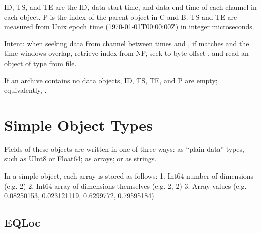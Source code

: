\documentclass[letterpaper,11pt,english]{sphinxmanual}
\begin{document}
ID, TS, and TE are the ID, data start time, and data end time of each channel
in each object. P is the index of the parent object in C and B. TS and TE are
measured from Unix epoch time (1970-01-01T00:00:00Z) in integer microseconds.

Intent: when seeking data from channel  between times  and ,
if  matches  and the time windows overlap, retrieve index
 from NP, seek to byte offset , and read an object of
type  from file.

If an archive contains no data objects, ID, TS, TE, and P are empty;
equivalently, .


\section{Simple Object Types}
\label{\detokenize{src/Appendices/seisio_file_format:simple-object-types}}
Fields of these objects are written in one of three ways: as “plain data” types,
such as UInt8 or Float64; as arrays; or as strings.

In a simple object, each array is stored as follows:
1. Int64 number of dimensions (e.g. 2)
2. Int64 array of dimensions themselves (e.g. 2, 2)
3. Array values (e.g. 0.08250153, 0.023121119, 0.6299772, 0.79595184)


\subsection{EQLoc}
\label{\detokenize{src/Appendices/seisio_file_format:eqloc}}
\end{document}
